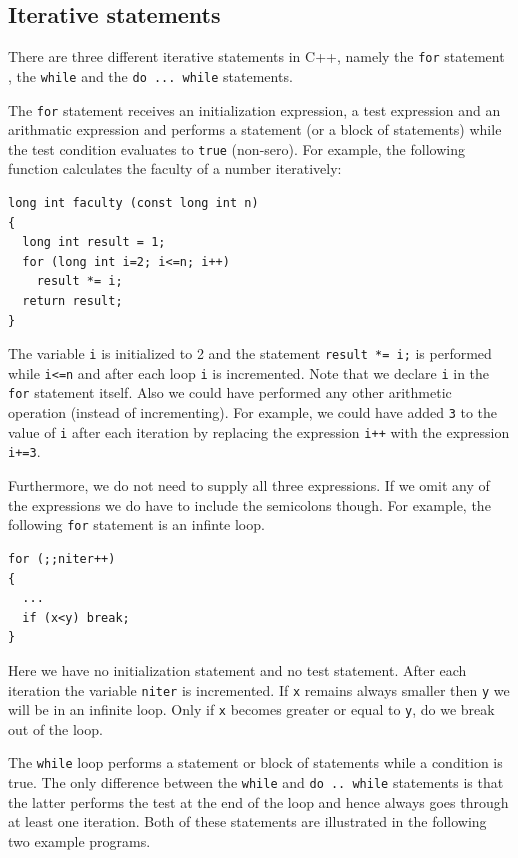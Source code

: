 
\subsection{Iterative statements}

There are three different iterative statements in C++, namely the \verb+for+
statement , the \verb+while+ and the \verb+do ... while+ statements.

The \verb+for+ statement receives an initialization expression, a test expression
and an arithmatic expression and performs a statement (or a block of statements)
while the test condition evaluates to \verb+true+ (non-sero). For example, the
following function calculates the faculty of a number iteratively:
{\small \begin{verbatim}
long int faculty (const long int n)
{
  long int result = 1;
  for (long int i=2; i<=n; i++)
    result *= i;
  return result;
}
\end{verbatim}}
\noindent
The variable \verb+i+ is initialized to 2 and the statement \verb+result *= i;+ is performed
while \verb+i<=n+ and after each loop \verb+i+ is incremented. Note that we declare
\verb+i+ in the \verb+for+ statement itself. Also we could have performed any other
arithmetic operation (instead of incrementing). For example, we could have added
\verb+3+ to the value of \verb+i+ after each iteration by replacing the expression
\verb&i++& with the expression \verb&i+=3&.

Furthermore, we do not need to supply all three expressions. If we omit any of the
expressions we do have to include the semicolons though. For example, the following
\verb+for+ statement is an infinte loop.
{\small \begin{verbatim}
for (;;niter++)
{
  ...
  if (x<y) break;
}
\end{verbatim}}
\noindent
Here we have no initialization statement and no test statement. After each iteration
the variable \verb+niter+ is incremented. If \verb+x+ remains always smaller then \verb+y+
we will be in an infinite loop. Only if \verb+x+ becomes greater or equal to \verb+y+, do we
break out of the loop.

The \verb+while+ loop performs a statement or block of statements while
a condition is true. The only difference between the \verb+while+ and \verb+do .. while+
statements is that the latter performs the test at the end of the loop and hence always
goes through at least one iteration. Both of these statements are illustrated in the
following two example programs.

